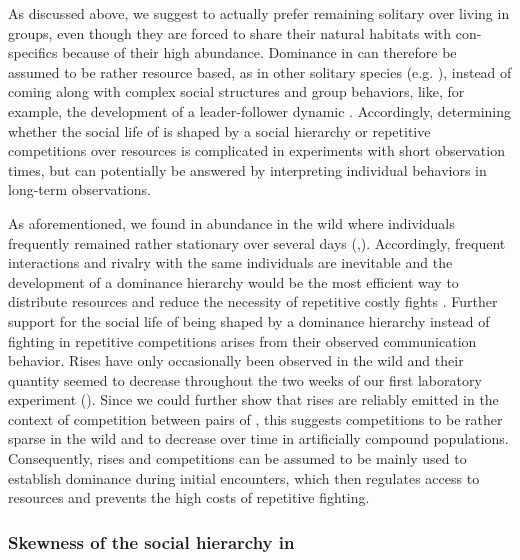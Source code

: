 As discussed above, we suggest \lepto{} to actually prefer remaining solitary over living in groups, even though they are forced to share their natural habitats with con-specifics because of their high abundance. Dominance in \lepto{} can therefore be assumed to be rather resource based, as in other solitary species (e.g. \citealp{Cigliano1993}), instead of coming along with complex social structures and group behaviors, like, for example, the development of a leader-follower dynamic \citep{Strandburg2018}. Accordingly, determining whether the social life of \lepto{} is shaped by a social hierarchy or repetitive competitions over resources is complicated in experiments with short observation times, but can potentially be answered by interpreting individual behaviors in long-term observations. 

As aforementioned, we found \lepto{} in abundance in the wild where individuals frequently remained rather stationary over several days (,). Accordingly, frequent interactions and rivalry with the same individuals are inevitable and the development of a dominance hierarchy would be the most efficient way to distribute resources and reduce the necessity of repetitive costly fights \citep{Sapolsky2005}. Further support for the social life of \lepto{} being shaped by a dominance hierarchy instead of fighting in repetitive competitions arises from their observed communication behavior. Rises have only occasionally been observed in the wild and their quantity seemed to decrease throughout the two weeks of our first laboratory experiment (). Since we could further show that rises are reliably emitted in the context of competition between pairs of \lepto{} \citep{Raab2021}, this suggests competitions to be rather sparse in the wild and to decrease over time in artificially compound populations. Consequently, rises and competitions can be assumed to be mainly used to establish dominance during initial encounters, which then regulates access to resources and prevents the high costs of repetitive fighting.

\subsubsection{Skewness of the social hierarchy in \lepto{}}

